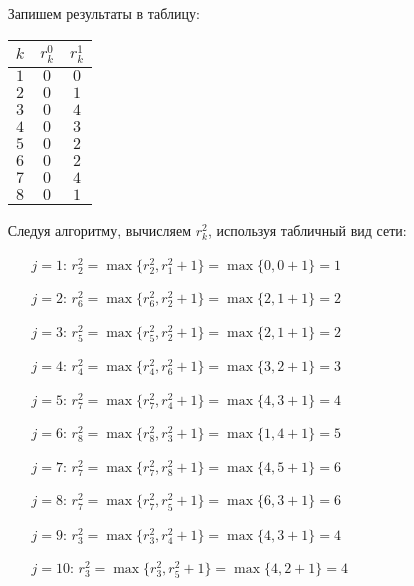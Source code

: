 \begin{itemize}[nosep]
	\bigskip

	Запишем результаты в таблицу:
	\begin{table}[H]
		\centering
		\begin{tabular}{ | c | c | c | } 
			\hline
			$k$ & $r_k^0$ & $r_k^1$ \\ \hline
			$1$ & $0$ & $0$ \\ \hline
			$2$ & $0$ & $1$ \\ \hline
			$3$ & $0$ & $4$ \\ \hline
			$4$ & $0$ & $3$ \\ \hline
			$5$ & $0$ & $2$ \\ \hline
			$6$ & $0$ & $2$ \\ \hline
			$7$ & $0$ & $4$ \\ \hline
			$8$ & $0$ & $1$ \\ \hline
		\end{tabular}
	\end{table}

	\item[\fbox{$i=2$}] Следуя алгоритму, вычисляем $r^2_k$, используя табличный вид сети:

	\begin{enumerate}[nosep]
		\item[\underline{$j=1$}:] $r_2^2 = \max\{r_2^2, r_1^2 + 1\} = \max\{0,0+1\} = 1$
		\item[\underline{$j=2$}:] $r_6^2 = \max\{r_6^2, r_2^2 + 1\} = \max\{2,1+1\} = 2$
		\item[\underline{$j=3$}:] $r_5^2 = \max\{r_5^2, r_2^2 + 1\} = \max\{2,1+1\} = 2$
		\item[\underline{$j=4$}:] $r_4^2 = \max\{r_4^2, r_6^2 + 1\} = \max\{3,2+1\} = 3$
		\item[\underline{$j=5$}:] $r_7^2 = \max\{r_7^2, r_4^2 + 1\} = \max\{4,3+1\} = 4$
		\item[\underline{$j=6$}:] $r_8^2 = \max\{r_8^2, r_3^2 + 1\} = \max\{1,4+1\} = 5$
		\item[\underline{$j=7$}:] $r_7^2 = \max\{r_7^2, r_8^2 + 1\} = \max\{4,5+1\} = 6$
		\item[\underline{$j=8$}:] $r_7^2 = \max\{r_7^2, r_5^2 + 1\} = \max\{6,3+1\} = 6$
		\item[\underline{$j=9$}:] $r_3^2 = \max\{r_3^2, r_4^2 + 1\} = \max\{4,3+1\} = 4$
		\item[\underline{$j=10$}:] $r_3^2 = \max\{r_3^2, r_5^2 + 1\} = \max\{4,2+1\} = 4$
	\end{enumerate}

	\bigskip


\end{itemize}
